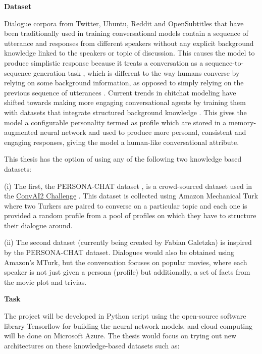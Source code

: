 \documentclass[paper=a4,11pt,parskip=half,toc=listof]{scrartcl}
\begin{document}
	\textbf{\normalsize {Dataset}}
	
	Dialogue corpora from Twitter, Ubuntu, Reddit and OpenSubtitles that have been traditionally used in training conversational models \cite{serban2015survey} contain a sequence of utterance and responses from different speakers without any explicit background knowledge linked to the speakers or topic of discussion. This causes the model to produce simplistic response because it treats a conversation as a sequence-to-sequence generation task \cite{li2015diversity}, which is different to the way humans converse by relying on some background information, as opposed to simply relying on the previous sequence of utterances \cite{dunbar1997human, moghe2018towards}. Current trends in chitchat modeling have shifted towards making more engaging conversational agents by training them with datasets that integrate structured background knowledge \cite{zhang2018personalizing, moghe2018towards}. This gives the model a configurable personality termed as profile which are stored in a memory-augmented neural network \cite{miller2016key, kumar2016ask} and used to produce more personal, consistent and engaging responses, giving the model a human-like conversational attribute.
	
	This thesis has the option of using any of the following two knowledge based datasets:
	
	(i) The first, the PERSONA-CHAT dataset \cite{zhang2018personalizing}, is a crowd-sourced dataset used in the \href{http://www.parl.ai/static/docs/tasks.html}{ConvAI2 Challenge} \cite{dinan2019second}. This dataset is collected using Amazon Mechanical Turk where two Turkers are paired to converse on a particular topic and each one is provided a random profile from a pool of profiles on which they have to structure their dialogue around.
	
	(ii) The second dataset (currently being created by Fabian Galetzka) is inspired by the PERSONA-CHAT dataset. Dialogues would also be obtained using Amazon's MTurk, but the conversation focuses on popular movies, where each speaker is not just given a persona (profile) but additionally, a set of facts from the movie plot and trivias.
	
	\textbf{\normalsize {Task}}
	
	The project will be developed in Python script using the open-source software library Tensorflow for building the neural network	models, and cloud computing will be done on Microsoft Azure. The thesis would focus on trying out new architectures on these knowledge-based datasets such as:
	
\end{document}
